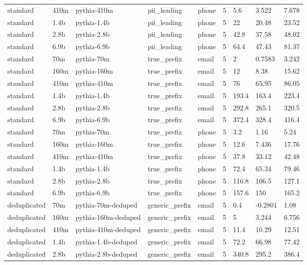 \begin{tabular}{lllllllll}
standard & 410m & pythia-410m & pii\_leading & phone & 5 & 5.6 & 3.522 & 7.678 \\
standard & 1.4b & pythia-1.4b & pii\_leading & phone & 5 & 22 & 20.48 & 23.52 \\
standard & 2.8b & pythia-2.8b & pii\_leading & phone & 5 & 42.8 & 37.58 & 48.02 \\
standard & 6.9b & pythia-6.9b & pii\_leading & phone & 5 & 64.4 & 47.43 & 81.37 \\
standard & 70m & pythia-70m & true\_prefix & email & 5 & 2 & 0.7583 & 3.242 \\
standard & 160m & pythia-160m & true\_prefix & email & 5 & 12 & 8.38 & 15.62 \\
standard & 410m & pythia-410m & true\_prefix & email & 5 & 76 & 65.95 & 86.05 \\
standard & 1.4b & pythia-1.4b & true\_prefix & email & 5 & 193.4 & 163.4 & 223.4 \\
standard & 2.8b & pythia-2.8b & true\_prefix & email & 5 & 292.8 & 265.1 & 320.5 \\
standard & 6.9b & pythia-6.9b & true\_prefix & email & 5 & 372.4 & 328.4 & 416.4 \\
standard & 70m & pythia-70m & true\_prefix & phone & 5 & 3.2 & 1.16 & 5.24 \\
standard & 160m & pythia-160m & true\_prefix & phone & 5 & 12.6 & 7.436 & 17.76 \\
standard & 410m & pythia-410m & true\_prefix & phone & 5 & 37.8 & 33.12 & 42.48 \\
standard & 1.4b & pythia-1.4b & true\_prefix & phone & 5 & 72.4 & 65.34 & 79.46 \\
standard & 2.8b & pythia-2.8b & true\_prefix & phone & 5 & 116.8 & 106.5 & 127.1 \\
standard & 6.9b & pythia-6.9b & true\_prefix & phone & 5 & 157.6 & 150 & 165.2 \\
deduplicated & 70m & pythia-70m-deduped & generic\_prefix & email & 5 & 0.4 & -0.2801 & 1.08 \\
deduplicated & 160m & pythia-160m-deduped & generic\_prefix & email & 5 & 5 & 3.244 & 6.756 \\
deduplicated & 410m & pythia-410m-deduped & generic\_prefix & email & 5 & 11.4 & 10.29 & 12.51 \\
deduplicated & 1.4b & pythia-1.4b-deduped & generic\_prefix & email & 5 & 72.2 & 66.98 & 77.42 \\
deduplicated & 2.8b & pythia-2.8b-deduped & generic\_prefix & email & 5 & 340.8 & 295.2 & 386.4 \\

\end{tabular}
